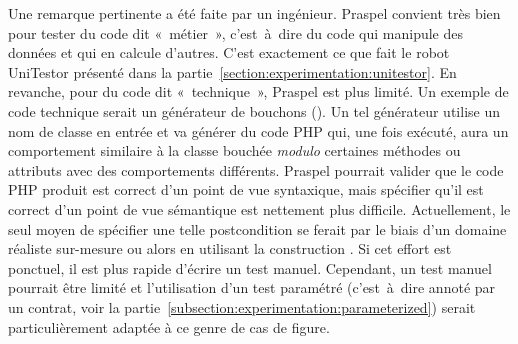 Une remarque pertinente a été faite par un ingénieur. Praspel convient très bien
pour tester du code dit «~métier~», c'est~à~dire du code qui manipule des
données et qui en calcule d'autres. C'est exactement ce que fait le robot
UniTestor présenté dans la partie~\ref{section:experimentation:unitestor}. En
revanche, pour du code dit «~technique~», Praspel est plus limité. Un exemple de
code technique serait un générateur de bouchons (). Un
tel générateur utilise un nom de classe en entrée et va générer du code PHP qui,
une fois exécuté, aura un comportement similaire à la classe bouchée {\em
modulo} certaines méthodes ou attributs avec des comportements différents.
Praspel pourrait valider que le code PHP produit est correct d'un point de vue
syntaxique, mais spécifier qu'il est correct d'un point de vue sémantique est
nettement plus difficile. Actuellement, le seul moyen de spécifier une telle
postcondition se ferait par le biais d'un domaine réaliste sur-mesure ou alors
en utilisant la construction \apred{\empty}. Si cet effort est ponctuel, il est
plus rapide d'écrire un test manuel. Cependant, un test manuel pourrait être
limité et l'utilisation d'un test paramétré (c'est~à~dire annoté par un contrat,
voir la partie~\ref{subsection:experimentation:parameterized}) serait
particulièrement adaptée à ce genre de cas de figure.
